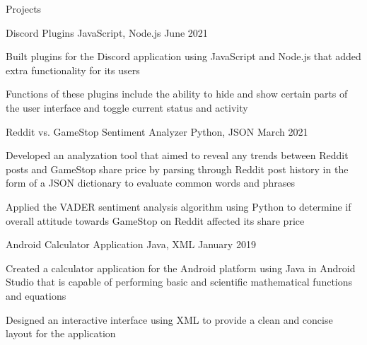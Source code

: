 \documentclass{cvtemplate}[]
\begin{document}

\begin{cvsection}{Projects}


\begin{cvsubsection}
{Discord Plugins}
{JavaScript, Node.js}
{June 2021}
{}
\item Built plugins for the Discord application using JavaScript and Node.js that added extra functionality for its users
\item Functions of these plugins include the ability to hide and show certain parts of the user interface and toggle current status and activity
\end{cvsubsection}




\begin{cvsubsection}
{Reddit vs. GameStop Sentiment Analyzer}
{Python, JSON}
{March 2021}
{}
\item Developed an analyzation tool that aimed to reveal any trends between Reddit posts and GameStop share price by parsing through Reddit post history in the form of a JSON dictionary to evaluate common words and phrases
\item Applied the VADER sentiment analysis algorithm using Python to determine if overall attitude towards GameStop on Reddit affected its share price
\end{cvsubsection}


\begin{cvsubsection}
{Android Calculator Application}
{Java, XML}
{January 2019}
{}
\item Created a calculator application for the Android platform using Java in Android Studio that is capable of performing basic and scientific mathematical functions and equations
\item Designed an interactive interface using XML to provide a clean and concise layout for the application
\end{cvsubsection}


\end{cvsection}

\end{document}
